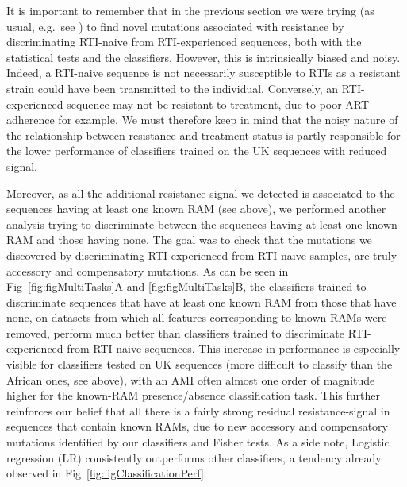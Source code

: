 \documentclass[
  11pt,
  twoside,
  BCOR=10mm,
  listof=totoc]{scrbook}
\begin{document}
It is important to remember that in the previous section we were trying
(as usual, e.g.~see \autocite{villabona-arenasIndepthAnalysisHIV12016}) to find
novel mutations associated with resistance by discriminating RTI-naive
from RTI-experienced sequences, both with the statistical tests and the
classifiers. However, this is intrinsically biased and noisy. Indeed, a
RTI-naive sequence is not necessarily susceptible to RTIs as a resistant
strain could have been transmitted to the individual. Conversely, an
RTI-experienced sequence may not be resistant to treatment, due to poor
ART adherence for example. We must therefore keep in mind that the noisy
nature of the relationship between resistance and treatment status is
partly responsible for the lower performance of classifiers trained on
the UK sequences with reduced signal.

Moreover, as all the additional resistance signal we detected is
associated to the sequences having at least one known RAM (see above),
we performed another analysis trying to discriminate between the
sequences having at least one known RAM and those having none. The goal
was to check that the mutations we discovered by discriminating
RTI-experienced from RTI-naive samples, are truly accessory and
compensatory mutations. As can be seen in
Fig~\ref{fig:figMultiTasks}A
and \ref{fig:figMultiTasks}B,
the classifiers trained to discriminate sequences that have at least one
known RAM from those that have none, on datasets from which all features
corresponding to known RAMs were removed, perform much better than
classifiers trained to discriminate RTI-experienced from RTI-naive
sequences. This increase in performance is especially visible for
classifiers tested on UK sequences (more difficult to classify than the
African ones, see above), with an AMI often almost one order of
magnitude higher for the known-RAM presence/absence classification task.
This further reinforces our belief that all there is a fairly strong
residual resistance-signal in sequences that contain known RAMs, due to
new accessory and compensatory mutations identified by our classifiers
and Fisher tests. As a side note, Logistic regression (LR) consistently
outperforms other classifiers, a tendency already observed in
Fig~\ref{fig:figClassificationPerf}.
\end{document}
